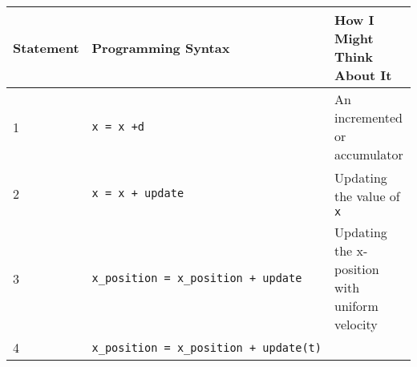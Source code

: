 \begin{longtable}[]{@{}lll@{}}
\toprule
\begin{minipage}[b]{0.08\columnwidth}\raggedright\strut
Statement
\strut\end{minipage} &
\begin{minipage}[b]{0.08\columnwidth}\raggedright\strut
Programming Syntax
\strut\end{minipage} &
\begin{minipage}[b]{0.08\columnwidth}\raggedright\strut
How I Might Think About It
\strut\end{minipage}\tabularnewline
\midrule
\endhead
\begin{minipage}[t]{0.08\columnwidth}\raggedright\strut
1
\strut\end{minipage} &
\begin{minipage}[t]{0.08\columnwidth}\raggedright\strut
\texttt{x\ =\ x\ +d}
\strut\end{minipage} &
\begin{minipage}[t]{0.08\columnwidth}\raggedright\strut
An incremented or accumulator
\strut\end{minipage}\tabularnewline
\begin{minipage}[t]{0.08\columnwidth}\raggedright\strut
2
\strut\end{minipage} &
\begin{minipage}[t]{0.08\columnwidth}\raggedright\strut
\texttt{x\ =\ x\ +\ update}
\strut\end{minipage} &
\begin{minipage}[t]{0.08\columnwidth}\raggedright\strut
Updating the value of \texttt{x}
\strut\end{minipage}\tabularnewline
\begin{minipage}[t]{0.08\columnwidth}\raggedright\strut
3
\strut\end{minipage} &
\begin{minipage}[t]{0.08\columnwidth}\raggedright\strut
\texttt{x\_position\ =\ x\_position\ +\ update}
\strut\end{minipage} &
\begin{minipage}[t]{0.08\columnwidth}\raggedright\strut
Updating the x-position with uniform velocity
\strut\end{minipage}\tabularnewline
\begin{minipage}[t]{0.08\columnwidth}\raggedright\strut
4
\strut\end{minipage} &
\begin{minipage}[t]{0.08\columnwidth}\raggedright\strut
\texttt{x\_position\ =\ x\_position\ +\ update(t)}

\end{minipage}
\end{longtable}
